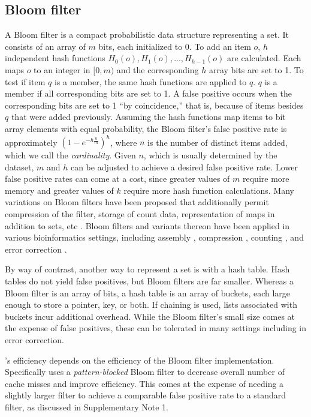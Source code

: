 \documentclass{bmcart}
\begin{document}
\subsection*{Bloom filter}
A Bloom filter \cite{bloom1970space} is a compact probabilistic data structure representing a set.  It consists of an array of $m$ bits, each initialized to 0.  To add an item $o$, $h$ independent hash functions $H_0(o), H_1(o),...,H_{h-1}(o)$ are calculated.  Each maps $o$ to an integer in $[0, m)$ and the corresponding $h$ array bits are set to 1. To test if item $q$ is a member, the same hash functions are applied to $q$.  $q$ is a member if all corresponding bits are set to 1.  A false positive occurs when the corresponding bits are set to 1 ``by coincidence,'' that is, because of items besides $q$ that were added previously.  Assuming the hash functions map items to bit array elements with equal probability, the Bloom filter's false positive rate is approximately $(1-e^{-h\frac{n}{m}})^h$, where $n$ is the number of distinct items added, which we call the \emph{cardinality}.  Given $n$, which is usually determined by the dataset, $m$ and $h$ can be adjusted to achieve a desired false positive rate.  Lower false positive rates can come at a cost, since greater values of $m$ require more memory and greater values of $k$ require more hash function calculations.  Many variations on Bloom filters have been proposed that additionally permit compression of the filter, storage of count data, representation of maps in addition to sets, etc \cite{tarkoma2012theory}.  Bloom filters and variants thereon have been applied in various bioinformatics settings, including assembly \cite{pell2012scaling}, compression \cite{jones2012compression}, \kmer counting \cite{melsted2011efficient}, and error correction \cite{shi2010parallel}.

By way of contrast, another way to represent a set is with a hash table.  Hash tables do not yield false positives, but Bloom filters are far smaller.  Whereas a Bloom filter is an array of bits, a hash table is an array of buckets, each large enough to store a pointer, key, or both.  If chaining is used, lists associated with buckets incur additional overhead.  While the Bloom filter's small size comes at the expense of false positives, these can be tolerated in many settings including in error correction.

\tool's efficiency depends on the efficiency of the Bloom filter implementation.  Specifically \tool uses a \emph{pattern-blocked} Bloom filter to decrease overall number of cache misses and improve efficiency.  This comes at the expense of needing a slightly larger filter to achieve a comparable false positive rate to a standard filter, as discussed in Supplementary Note 1.
\end{document}
